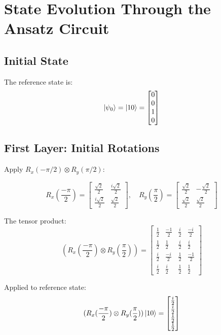 \documentclass[
	a4paper,
	12pt,
	oneside,
]{article}
\begin{document}
\section{State Evolution Through the Ansatz Circuit}

\subsection{Initial State}

The reference state is:
\[
\ket{\psi_0} = \ket{10} = \begin{bmatrix} 0 \\ 0 \\ 1 \\ 0 \end{bmatrix}
\]

\subsection{First Layer: Initial Rotations}

Apply $R_x(-\pi/2) \otimes R_y(\pi/2)$:

\[
R_x(\frac{-\pi}{2}) = \begin{bmatrix}
	\frac{\sqrt{2}}{2} & \frac{i\sqrt{2}}{2} \\
	\frac{i\sqrt{2}}{2} & \frac{\sqrt{2}}{2}
\end{bmatrix}, \quad
R_y(\frac{\pi}{2}) = \begin{bmatrix}
	\frac{\sqrt{2}}{2} & -\frac{\sqrt{2}}{2} \\
	\frac{\sqrt{2}}{2} & \frac{\sqrt{2}}{2}
\end{bmatrix}
\]

The tensor product:
\[
(R_x(\frac{-\pi}{2}) \otimes R_y(\frac{\pi}{2})) = \begin{bmatrix}
	\frac{1}{2} & \frac{-1}{2} & \frac{i}{2} & \frac{-i}{2} \\
	\frac{1}{2} & \frac{1}{2} & \frac{i}{2} & \frac{i}{2} \\
	\frac{i}{2} & \frac{-i}{2} & \frac{1}{2} & \frac{-1}{2} \\
	\frac{i}{2} & \frac{i}{2} & \frac{1}{2} & \frac{1}{2}
\end{bmatrix}
\]

Applied to reference state:
\[
(R_x(\frac{-\pi}{2}) \otimes R_y(\frac{\pi}{2})) \ket{10} = \begin{bmatrix}
	\frac{i}{2} \\
	\frac{i}{2} \\
	\frac{1}{2} \\
	\frac{1}{2}
\end{bmatrix}
\]
\end{document}
